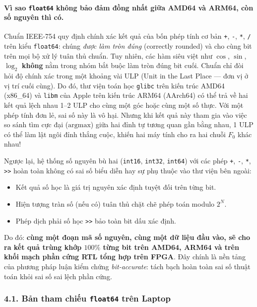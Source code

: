 \documentclass[11pt,a4paper]{article}
\begin{document}
\paragraph{Vì sao \texttt{float64} không bảo đảm đồng nhất giữa AMD64 và ARM64, còn số nguyên thì có.}
Chuẩn IEEE-754 quy định chính xác kết quả của bốn phép tính cơ bản \texttt{+}, \texttt{-}, \texttt{*}, \texttt{/} trên kiểu \texttt{float64}: chúng \emph{được làm tròn đúng} (correctly rounded) và cho cùng bit trên mọi bộ xử lý tuân thủ chuẩn. Tuy nhiên, các hàm siêu việt như $\cos$, $\sin$, $\log_2$ \textbf{không} nằm trong nhóm bắt buộc làm tròn đúng bit cuối. Chuẩn chỉ đòi hỏi độ chính xác trong một khoảng vài ULP (Unit in the Last Place --- đơn vị ở vị trí cuối cùng).
Do đó, thư viện toán học \texttt{glibc} trên kiến trúc AMD64 (x86\_64) và \texttt{libm} của Apple trên kiến trúc ARM64 (AArch64) có thể trả về hai kết quả lệch nhau 1--2 ULP cho cùng một góc hoặc cùng một số thực. Với một phép tính đơn lẻ, sai số này là vô hại. Nhưng khi kết quả này tham gia vào việc so sánh tìm cực đại ($\text{argmax}$) giữa hai đỉnh tự tương quan gần bằng nhau, 1 ULP có thể làm lật ngôi đỉnh thắng cuộc, khiến hai máy tính cho ra hai chuỗi $F_0$ khác nhau!

Ngược lại, hệ thống số nguyên bù hai (\texttt{int16}, \texttt{int32}, \texttt{int64}) với các phép \texttt{+}, \texttt{-}, \texttt{*}, \texttt{>>} hoàn toàn không có sai số biểu diễn hay sự phụ thuộc vào thư viện bên ngoài:
\begin{itemize}
    \setlength{\itemsep}{0.5pt}
    \item Kết quả số học là giá trị nguyên xác định tuyệt đối trên từng bit.
    \item Hiện tượng tràn số (nếu có) tuân thủ chặt chẽ phép toán modulo $2^N$.
    \item Phép dịch phải số học \texttt{>>} bảo toàn bit dấu xác định.
\end{itemize}
Do đó: \textbf{cùng một đoạn mã số nguyên, cùng một dữ liệu đầu vào, sẽ cho ra kết quả trùng khớp $100\%$ từng bit trên AMD64, ARM64 và trên khối mạch phần cứng RTL tổng hợp trên FPGA}. Đây chính là nền tảng của phương pháp luận kiểm chứng \emph{bit-accurate}: tách bạch hoàn toàn sai số thuật toán khỏi sai số sai lệch phần cứng.

\subsubsection*{4.1. Bản tham chiếu \texttt{float64} trên Laptop}
\end{document}
